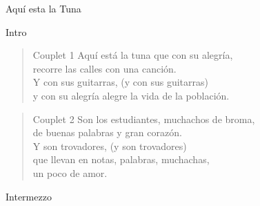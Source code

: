\begin{song}{Aquí esta la Tuna}
\begin{instrumental}{Intro}
  \measure{} 
 \measure{} \measure{} 
 \measure{} \measure{} 
 \measure{} \measure{}   \measure{} 
\end{instrumental}

\begin{verse}{Couplet 1}
Aqu\'{i} est\'{a} la tuna que con su alegría,\\
recorre las calles con una canción.\\
\chord{}Y con sus guitarras, (y con sus guitarras)\\
y con su alegr\'{i}a alegre la vida de la población.
\end{verse}

\begin{verse}{Couplet 2}
Son los estudiantes, muchachos de broma,\\
de buenas palabras y gran corazón.\\
\chord{}Y son trovadores, (y son trovadores)\\
\chord{}que llevan en notas, palabras, muchachas,\\
un poco de amor.\hspace{1em} \hspace{2em}
\end{verse}

\begin{instrumental}{Intermezzo}
  \measure{} 
 \measure{} \measure{} 
 \measure{} \measure{} 
 \measure{} \measure{}   \end{instrumental}


\end{song}
